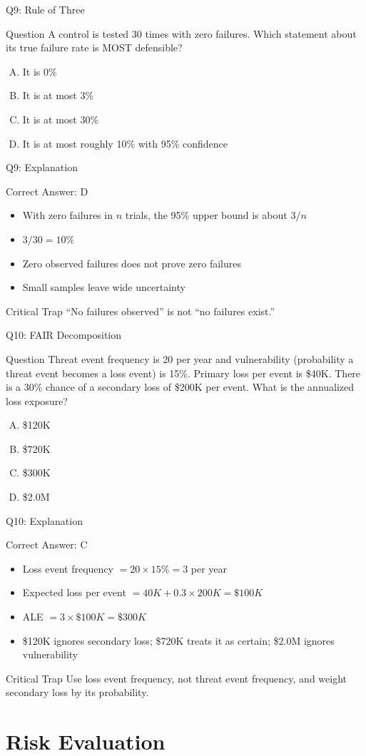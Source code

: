 \documentclass[aspectratio=169]{beamer}
\newcommand{\hq}[7]{%
	\begin{frame}{Q#1: #2}
		\begin{block}{Question}
			#3
		\end{block}
		\begin{enumerate}[(A)]
			#4
		\end{enumerate}
	\end{frame}
	\begin{frame}{Q#1: Explanation}
		\begin{block}{Correct Answer: #5}
			\begin{itemize}
				#6
			\end{itemize}
		\end{block}
		\begin{alertblock}{Critical Trap}
			#7
		\end{alertblock}
	\end{frame}
}
\begin{document}
	\hq{9}{Rule of Three}
	{A control is tested 30 times with zero failures. Which statement about its true failure rate is MOST defensible?}
	{\item It is 0\%
		\item It is at most 3\%
		\item It is at most 30\%
		\item It is at most roughly 10\% with 95\% confidence}
	{D}
	{\item With zero failures in $n$ trials, the 95\% upper bound is about $3/n$
		\item $3/30 = 10\%$
		\item Zero observed failures does not prove zero failures
		\item Small samples leave wide uncertainty}
	{``No failures observed'' is not ``no failures exist.''}
	
	\hq{10}{FAIR Decomposition}
	{Threat event frequency is 20 per year and vulnerability (probability a threat event becomes a loss event) is 15\%. Primary loss per event is \$40K. There is a 30\% chance of a secondary loss of \$200K per event. What is the annualized loss exposure?}
	{\item \$120K
		\item \$720K
		\item \$300K
		\item \$2.0M}
	{C}
	{\item Loss event frequency $= 20 \times 15\% = 3$ per year
		\item Expected loss per event $= 40K + 0.3 \times 200K = \$100K$
		\item ALE $= 3 \times \$100K = \$300K$
		\item \$120K ignores secondary loss; \$720K treats it as certain; \$2.0M ignores vulnerability}
	{Use loss event frequency, not threat event frequency, and weight secondary loss by its probability.}
	
	\section{Risk Evaluation}
	
\end{document}

